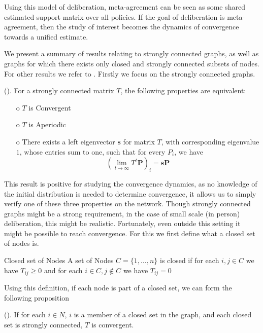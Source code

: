 Using this model of deliberation, meta-agreement can be seen as some shared estimated
support matrix over all policies. If the goal of deliberation is
meta-agreement, then the study of interest becomes the dynamics of convergence
towards a unified estimate. %

We present a summary of results relating to strongly connected graphs, as well
as graphs for which there exists only closed and strongly connected subsets of
nodes. For other results we refer to \citet{golubNaiveLearningSocial2010}.
Firstly we focus on the strongly connected graphs.

\begin{proposition}{(\citet{golubNaiveLearningSocial2010}).} For a strongly
	connected matrix \(T\), the following properties are equivalent:
	\begin{itemize} \item[o] \(T\) is Convergent \item[o] \(T\) is
		Aperiodic \item[o] There exists a left eigenvector
		\(\boldsymbol{s}\) for matrix \(T\), with corresponding
		eigenvalue \(1\), whose entries sum to one, such that for every
		$P_i$, we have \[\left(\lim_{t\to \infty}T^{t}
	\boldsymbol{P}\right)_{i} = \boldsymbol{s}\boldsymbol{P}\]
\end{itemize} \end{proposition}

This result is positive for studying the convergence dynamics, as no knowledge
of the initial distribution is needed to determine convergence, it allows us to
simply verify one of these three properties on the network. Though strongly
connected graphs might be a strong requirement, in the case of small scale (in
person) deliberation, this might be realistic. Fortunately, even outside this
setting it might be possible to reach convergence. For this we first define
what a closed set of nodes is.

\begin{definition}{Closed set of Nodes}{} A set of Nodes \(C = \{1, \dots,
n\}\) is closed if for each \(i,j \in C\) we have $T_{ij} \geq 0$ and for each
\(i \in C, j \notin C\) we have \(T_{ij} = 0\) \end{definition}

Using this definition, if each node is part of a closed set, we can form the
following proposition

\begin{proposition}{(\citet{golubNaiveLearningSocial2010}).} If for each \(i
\in N\), \(i\) is a member of a closed set in the graph, and each closed set is
strongly connected, \(T\) is convergent. \end{proposition}


